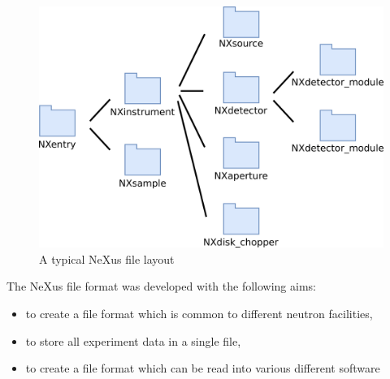 \begin{figure}
\includegraphics[width=0.7\linewidth]{instrument_arch.png}
\caption{A typical NeXus file layout}
\end{figure}


The NeXus file format was developed with the following aims:
\begin{itemize}
\item to create a file format which is common to different neutron facilities,
\item to store all experiment data in a single file,
\item to create a file format which can be read into various different software 
\end{itemize}

